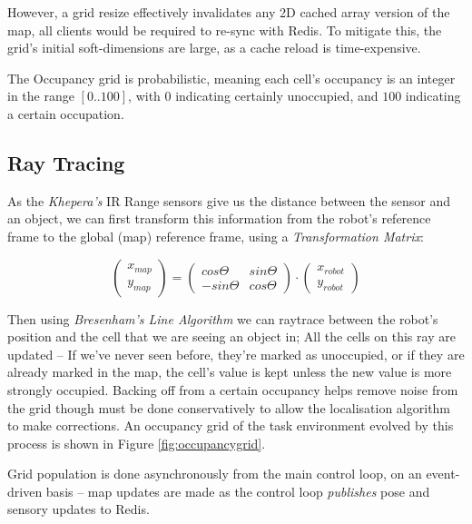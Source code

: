 \documentclass[11pt, a4paper]{article}
\begin{document}
However, a grid resize effectively invalidates any 2D cached array version of the map, all clients 
would be required to re-sync with Redis. To mitigate this, the grid's initial soft-dimensions
are large, as a cache reload is time-expensive.

The Occupancy grid is probabilistic, meaning each cell's occupancy is an integer in the range 
${[0..100]}$, with $0$ indicating certainly unoccupied, and $100$ indicating a certain occupation.

\subsection{Ray Tracing}

As the \textit{Khepera's} IR Range sensors give us the distance between the sensor and an object,
we can first transform this information from the robot's reference frame to the global (map)
reference frame, using a \textit{Transformation Matrix}:

\begin{equation}
  \begin{pmatrix}
    x_{map} \\
    y_{map}
  \end{pmatrix} = 
  \begin{pmatrix} 
    cos\Theta & sin\Theta \\
    -sin\Theta & cos\Theta
  \end{pmatrix}
  \cdot
  \begin{pmatrix}
    x_{robot} \\
    y_{robot}
  \end{pmatrix}
\end{equation}

Then using \textit{Bresenham's Line Algorithm} \cite{raytracealgo} we can raytrace between the
robot's position and the cell that we are seeing an object in; All the cells on this ray are 
updated -- If we've never seen before, they're marked as unoccupied, or if they are already 
marked in the map, the cell's value is kept unless the new value is more strongly occupied.
Backing off from a certain occupancy helps remove noise from the grid though
must be done conservatively to allow the localisation algorithm to make corrections.
An occupancy grid of the task environment evolved by this process is shown 
in Figure \ref{fig:occupancygrid}.

Grid population is done asynchronously from the main control loop, on an event-driven basis --
map updates are made as the control loop \textit{publishes} pose and sensory updates to Redis.
\end{document}
